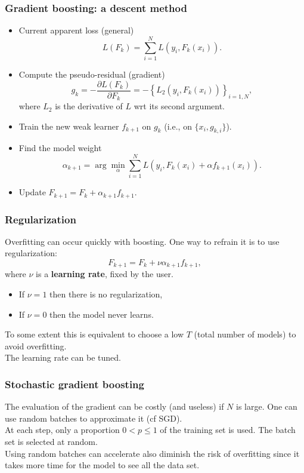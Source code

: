 \begin{frame}
\frametitle{Gradient boosting: a descent method}
\small
\begin{itemize}
\item Current apparent loss (general)
$$
L(F_k) = \sum_{i=1}^N L(y_i, F_k(x_i)).
$$
\item Compute the pseudo-residual (gradient) 
$$
g_k = -\frac{\partial L(F_k)}{\partial F_k} = -\left\{L_2(y_i, F_k(x_i))\right\}_{i=1,N},
$$
where $L_2$ is the derivative of $L$ wrt its second argument.
\item Train the new weak learner $f_{k+1}$ on $g_k$ (i.e., on $\{x_i, g_{k,i}\}$).
\item Find the model weight
$$
\alpha_{k+1} = \arg\min_{\alpha} \sum_{i=1}^N L(y_i, F_k(x_i) + \alpha f_{k+1}(x_i)).
$$
\item Update $F_{k+1} = F_k + \alpha_{k+1} f_{k+1}$.
\end{itemize}
\normalsize
\end{frame}
\begin{frame}
\frametitle{Regularization}
Overfitting can occur quickly with boosting. One way to refrain it is to use regularization:
$$
F_{k+1} = F_{k} + \nu \alpha_{k+1} f_{k+1},
$$
where $\nu$ is a {\bf learning rate}, fixed by the user.
\begin{itemize}
\item If $\nu = 1$ then there is no regularization,
\item If $\nu = 0$ then the model never learns.
\end{itemize}
To some extent this is equivalent to choose a low $T$ (total number of models) to avoid overfitting.\\
\vspace{0.3cm}
The learning rate can be tuned.
\end{frame}
\begin{frame}
\frametitle{Stochastic gradient boosting}
The evaluation of the gradient can be costly (and useless) if $N$ is large. One can use random batches to approximate it (cf SGD).\\ 
\vspace{0.3cm}
At each step, only a proportion $0 < p \leq 1 $ of the training set is used. The batch set is selected at random.\\
\vspace{0.3cm}
Using random batches can accelerate also diminish the risk of overfitting since it takes more time for the model to see all the data set.
\end{frame}
